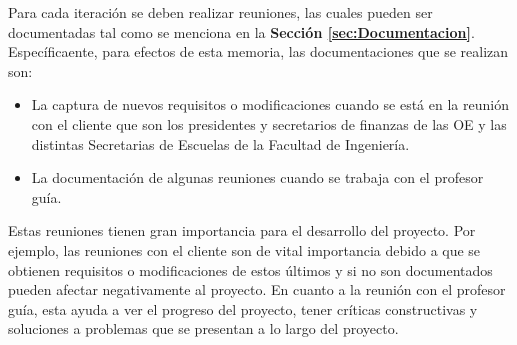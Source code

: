 Para cada iteración se deben realizar reuniones, las cuales pueden ser documentadas tal como se menciona en la \textbf{Sección \ref{sec:Documentacion}}. Específicaente, para efectos de esta memoria, las documentaciones que se realizan son:

\begin{itemize}
    \item La captura de nuevos requisitos o modificaciones cuando se está en la reunión con el cliente que son los presidentes y secretarios de finanzas de las OE y las distintas Secretarias de Escuelas de la Facultad de Ingeniería.
    \item La documentación de algunas reuniones cuando se trabaja con el profesor guía.
\end{itemize} 

Estas reuniones tienen gran importancia para el desarrollo del proyecto. Por ejemplo, las reuniones con el cliente son de vital importancia debido a que se obtienen requisitos o modificaciones de estos últimos y si no son documentados pueden afectar negativamente al proyecto. En cuanto a la reunión con el profesor guía, esta ayuda a ver el progreso del proyecto, tener críticas constructivas y soluciones a problemas que se presentan a lo largo del proyecto.
